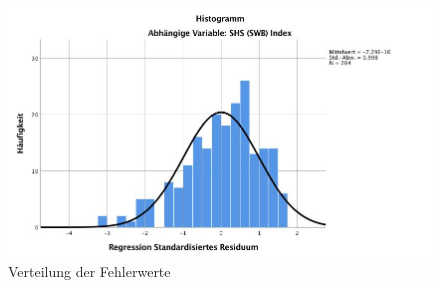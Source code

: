 \begin{figure}[h]
  \centering
     \includegraphics[scale=0.4]{content/Grafik/Histogramm_Hypo3_Normverteilung.jpg}
  \caption{Verteilung der Fehlerwerte}
  \label{fig:AppHypo3HistogrammResiduen}
\end{figure}